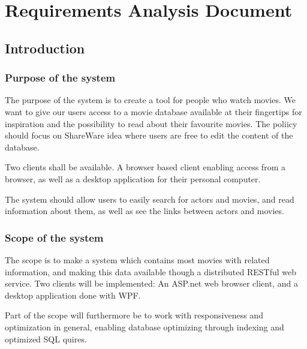 \chapter{Requirements Analysis Document}

\section{Introduction}
\label{sec:introduction}



\subsection{Purpose of the system}

The purpose of the system is to create a tool for people who watch movies. We want to give our users access to a movie database available at their fingertips for inspiration and the possibility to read about their favourite movies. The poliicy should focus on ShareWare idea where users are free to edit the content of the database.

Two clients shall be available. A browser based client enabling access from a browser, as well as a desktop application for their personal computer.  

The system should allow users to easily search for actors and movies, and read information about them, as well as see the links between actors and movies.




\subsection{Scope of the system}

The scope is to make a system which contains most movies with related information, and making this data available though a distributed RESTful web service. Two clients will be implemented: An ASP.net web browser client, and a desktop application done with WPF.

Part of the scope will furthermore be to work with responsiveness and optimization in general, enabling database optimizing through indexing and optimized SQL quires.



